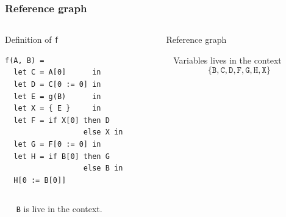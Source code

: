 \documentclass{beamer}
\newcommand{\cl}[1]{\texttt{#1}}
\begin{document}
\begin{frame}[fragile]
\frametitle{Reference graph}
\begin{columns}
\begin{column}{0.5\textwidth}
Definition of \cl{f}
\begin{lstlisting}
f(A, B) =
  let C = A[0]      in
  let D = C[0 := 0] in
  let E = g(B)      in
  let X = { E }     in
  let F = if X[0] then D
                  else X in
  let G = F[0 := 0] in
  let H = if B[0] then G
                  else B in
  H[0 := B[0]]
\end{lstlisting}
\end{column}
\begin{column}{0.5\textwidth}
Reference graph
\begin{center}
\end{center}
\ \newline
Variables lives in the context
$$\{ \cl{B}, \cl{C}, \cl{D}, \cl{F}, \cl{G}, \cl{H}, \cl{X} \}$$
\end{column}
\end{columns}
\ \newline \ \newline
\cl{B} is live in the context.
\end{frame}
\end{document}
